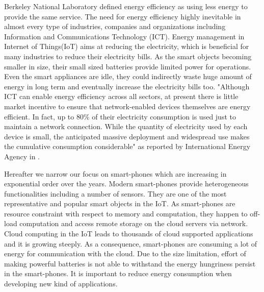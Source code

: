 Berkeley National Laboratory defined energy efficiency as using less energy to provide the same service. The need for energy efficiency highly inevitable in almost every type of industries, companies and organizations including Information and Communications Technology (ICT). Energy management in Internet of Things(IoT) aims at reducing the electricity, which is beneficial for many industries to reduce their electricity bills. As the smart objects becoming smaller in size, their small sized batteries provide limited power for operations. Even the smart appliances are idle, they could indirectly waste huge amount of energy in long term and eventually increase the electricity bills too. "Although ICT can enable energy efficiency across all sectors, at present there is little market incentive to ensure that network-enabled devices themselves are energy efficient. In fact, up to 80\% of their electricity consumption is used just to maintain a network connection. While the quantity of electricity used by each device is small, the anticipated massive deployment and widespread use makes the cumulative consumption considerable" as reported by International Energy Agency in \cite{IEA:bdle}.

Hereafter we narrow our focus on smart-phones which are increasing in exponential order over the years. Modern smart-phones provide heterogeneous functionalities including a number of sensors. They are one of the most representative and popular smart objects in the IoT. As smart-phones are resource constraint with respect to memory and computation, they happen to off-load computation and access remote storage on the cloud servers via network. Cloud computing in the IoT leads to thousands of cloud supported applications and it is growing steeply. As a consequence, smart-phones are consuming a lot of energy for communication with the cloud. Due to the size limitation, effort of making powerful batteries is not able to withstand the energy hungriness persist in the smart-phones. It is important to reduce energy consumption when developing new kind of applications.

